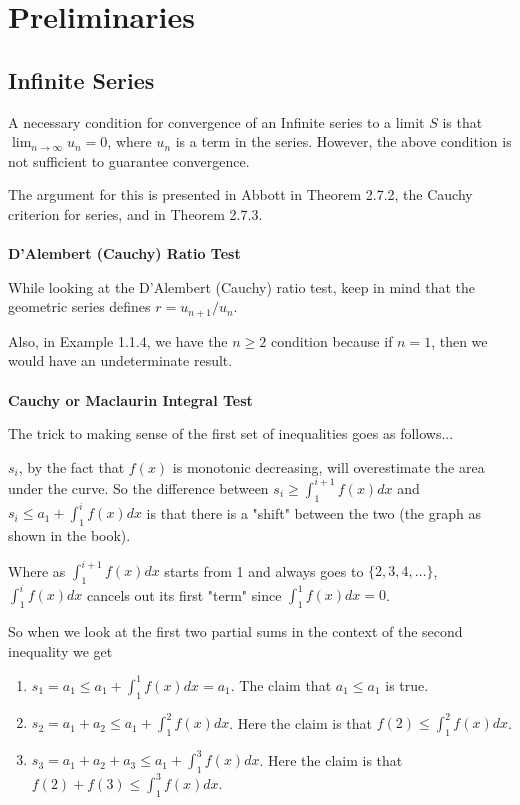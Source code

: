 \section{Preliminaries}

\subsection{Infinite Series}

A necessary condition for convergence of an Infinite series to a limit $S$ is that
$\lim_{n\rightarrow \infty} u_n = 0$, where $u_n$ is a term in the series.
However, the above condition is not sufficient to guarantee convergence.

The argument for this is presented in Abbott in Theorem 2.7.2, the Cauchy criterion for series,
and in Theorem 2.7.3.
\\~\\

\textbf{D'Alembert (Cauchy) Ratio Test}

While looking at the D'Alembert (Cauchy) ratio test, keep in mind that the geometric
series defines $r = u_{n+1} / u_n$.

Also, in Example 1.1.4, we have the $n \geq 2$ condition because if $n = 1$,
then we would have an undeterminate result.
\\~\\


\textbf{Cauchy or Maclaurin Integral Test}

The trick to making sense of the first set of inequalities goes as follows...

$s_i$, by the fact that $f(x)$ is monotonic decreasing, will overestimate the area under the curve.
So the difference between $s_i \geq \int_{1}^{i+1} f(x) dx$ and $s_i \leq a_1 + \int_{1}^{i} f(x) dx$
is that there is a "shift" between the two (the graph as shown in the book).

Where as $\int_{1}^{i+1} f(x) dx$ starts from 1 and always goes to $\{2, 3, 4, \ldots\}$,
$\int_{1}^{i} f(x) dx$ cancels out its first "term" since $\int_{1}^{1} f(x) dx = 0$.

So when we look at the first two partial sums in the context of the second inequality we get
\begin{enumerate}
    \item $s_1 = a_1             \leq a_1 + \int_{1}^{1} f(x) dx = a_1$. The claim that $a_1 \leq a_1$ is true.
    \item $s_2 = a_1 + a_2       \leq a_1 + \int_{1}^{2} f(x) dx$. Here the claim is that $f(2) \leq \int_{1}^{2} f(x) dx$.
    \item $s_3 = a_1 + a_2 + a_3 \leq a_1 + \int_{1}^{3} f(x) dx$. Here the claim is that $f(2) + f(3) \leq \int_{1}^{3} f(x) dx$.
\end{enumerate}